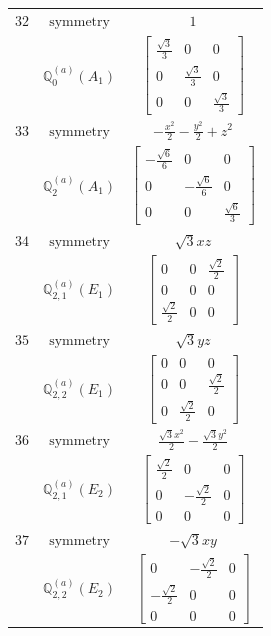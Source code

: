 \documentclass[fleqn,8pt,landscape]{jsarticle}
\begin{document}
\begin{longtable}{ccc}
$ 32 $ & $ \text{symmetry} $ & $ 1 $ \\
$  $ & $ \mathbb{Q}_{0}^{(a)}(A_{1}) $ & $ \begin{bmatrix} \frac{\sqrt{3}}{3} & 0 & 0 \\ 0 & \frac{\sqrt{3}}{3} & 0 \\ 0 & 0 & \frac{\sqrt{3}}{3} \end{bmatrix} $ \\ \hline
$ 33 $ & $ \text{symmetry} $ & $ - \frac{x^{2}}{2} - \frac{y^{2}}{2} + z^{2} $ \\
$  $ & $ \mathbb{Q}_{2}^{(a)}(A_{1}) $ & $ \begin{bmatrix} - \frac{\sqrt{6}}{6} & 0 & 0 \\ 0 & - \frac{\sqrt{6}}{6} & 0 \\ 0 & 0 & \frac{\sqrt{6}}{3} \end{bmatrix} $ \\ \hline
$ 34 $ & $ \text{symmetry} $ & $ \sqrt{3} x z $ \\
$  $ & $ \mathbb{Q}_{2,1}^{(a)}(E_{1}) $ & $ \begin{bmatrix} 0 & 0 & \frac{\sqrt{2}}{2} \\ 0 & 0 & 0 \\ \frac{\sqrt{2}}{2} & 0 & 0 \end{bmatrix} $ \\ \hline
$ 35 $ & $ \text{symmetry} $ & $ \sqrt{3} y z $ \\
$  $ & $ \mathbb{Q}_{2,2}^{(a)}(E_{1}) $ & $ \begin{bmatrix} 0 & 0 & 0 \\ 0 & 0 & \frac{\sqrt{2}}{2} \\ 0 & \frac{\sqrt{2}}{2} & 0 \end{bmatrix} $ \\ \hline
$ 36 $ & $ \text{symmetry} $ & $ \frac{\sqrt{3} x^{2}}{2} - \frac{\sqrt{3} y^{2}}{2} $ \\
$  $ & $ \mathbb{Q}_{2,1}^{(a)}(E_{2}) $ & $ \begin{bmatrix} \frac{\sqrt{2}}{2} & 0 & 0 \\ 0 & - \frac{\sqrt{2}}{2} & 0 \\ 0 & 0 & 0 \end{bmatrix} $ \\ \hline
$ 37 $ & $ \text{symmetry} $ & $ - \sqrt{3} x y $ \\
$  $ & $ \mathbb{Q}_{2,2}^{(a)}(E_{2}) $ & $ \begin{bmatrix} 0 & - \frac{\sqrt{2}}{2} & 0 \\ - \frac{\sqrt{2}}{2} & 0 & 0 \\ 0 & 0 & 0 \end{bmatrix} $ \\ \hline

\end{longtable}
\end{document}
